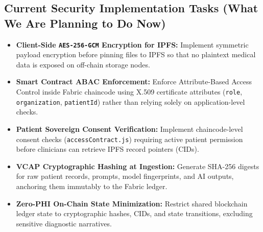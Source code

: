 \documentclass[11pt,a4paper]{article}
\begin{document}
\subsection{Current Security Implementation Tasks (What We Are Planning to Do Now)}
\begin{itemize}
    \item \textbf{Client-Side \texttt{AES-256-GCM} Encryption for IPFS:} Implement symmetric payload encryption before pinning files to IPFS so that no plaintext medical data is exposed on off-chain storage nodes.
    \item \textbf{Smart Contract ABAC Enforcement:} Enforce Attribute-Based Access Control inside Fabric chaincode using X.509 certificate attributes (\texttt{role}, \texttt{organization}, \texttt{patientId}) rather than relying solely on application-level checks.
    \item \textbf{Patient Sovereign Consent Verification:} Implement chaincode-level consent checks (\texttt{accessContract.js}) requiring active patient permission before clinicians can retrieve IPFS record pointers (CIDs).
    \item \textbf{VCAP Cryptographic Hashing at Ingestion:} Generate SHA-256 digests for raw patient records, prompts, model fingerprints, and AI outputs, anchoring them immutably to the Fabric ledger.
    \item \textbf{Zero-PHI On-Chain State Minimization:} Restrict shared blockchain ledger state to cryptographic hashes, CIDs, and state transitions, excluding sensitive diagnostic narratives.
\end{itemize}
\end{document}
